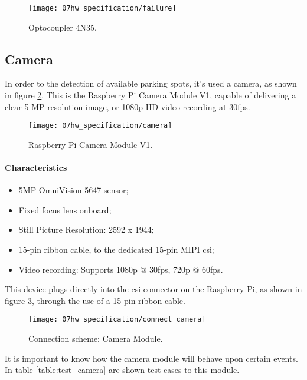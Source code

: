 \begin{figure}[H]
	\centering
	\texttt{[image: 07hw\_specification/failure]}
	\caption{Optocoupler 4N35.}
	\label{fig:failure}
\end{figure}

\subsection{Camera}
In order to the detection of available parking spots, it's used a camera, as shown in figure \ref{fig:camera}. This is the Raspberry Pi Camera Module V1, capable of delivering a clear 5 MP resolution image, or 1080p HD video recording at 30fps. \cite{camera}

\begin{figure}[H]
	\centering
	\texttt{[image: 07hw\_specification/camera]}
	\caption{Raspberry Pi Camera Module V1.}
	\label{fig:camera}
\end{figure}

\paragraph*{Characteristics}
\begin{itemize}
	\item 5MP OmniVision 5647 sensor;
	\item Fixed focus lens onboard;
	\item Still Picture Resolution: 2592 x 1944;
	\item 15-pin ribbon cable, to the dedicated 15-pin MIPI \ac{csi};
	\item Video recording: Supports 1080p @ 30fps, 720p @ 60fps.
\end{itemize}

\clearpage
{}
This device plugs directly into the \ac{csi} connector on the Raspberry Pi, as shown in figure \ref{fig:connect_camera}, through the use of a 15-pin ribbon cable.

\begin{figure}[ht]
	\centering
	\texttt{[image: 07hw\_specification/connect\_camera]}
	\caption{Connection scheme: Camera Module.}
	\label{fig:connect_camera}
\end{figure}

It is important to know how the camera module will behave upon certain events. In table \ref{table:test_camera} are shown test cases to this module.

